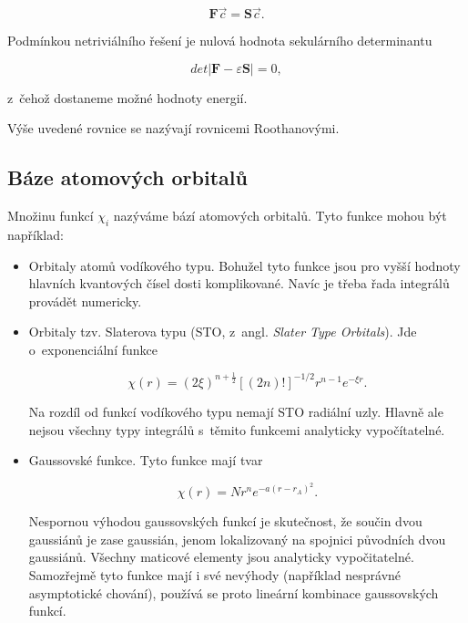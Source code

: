 \begin{equation}
\mathbf{F} \vec{c} = \mathbf{S} \vec{c}.
\label{rov:VE-54}
\end{equation}

Podmínkou netriviálního řešení je nulová hodnota sekulárního determinantu

\begin{equation}
det \vert \mathbf{F} - \varepsilon \mathbf{S} \vert = 0,
\label{rov:VE-55}
\end{equation}

z~čehož dostaneme možné hodnoty energií.

Výše uvedené rovnice se nazývají rovnicemi Roothanovými. 


\subsection{Báze atomových orbitalů}

Množinu funkcí $\chi_i$ nazýváme bází atomových orbitalů.  Tyto funkce mohou být například:
 
\begin{itemize}
\item Orbitaly atomů vodíkového typu. Bohužel tyto funkce jsou pro vyšší hodnoty hlavních kvantových čísel dosti komplikované. Navíc je třeba řada integrálů provádět numericky.

\item Orbitaly tzv. Slaterova typu (STO, z~angl. \textit{Slater Type Orbitals}). Jde o~exponenciální funkce

\begin{equation}
\chi(r) = (2 \xi)^{n+\frac{1}{2}} \left[ (2n)! \right]^{-1/2} r^{n-1} e^{-\xi r}.
\label{rov:VE-56}
\end{equation}

\noindent Na rozdíl od funkcí vodíkového typu nemají STO radiální uzly. Hlavně ale nejsou všechny typy integrálů s~těmito funkcemi analyticky vypočítatelné. 

\item Gaussovské funkce. Tyto funkce mají tvar

\begin{equation}
\chi(r) = N r^n e^{-a(r-r_A)^2}.
\label{rov:VE-57}
\end{equation}

\noindent Nespornou výhodou gaussovských funkcí je skutečnost, že součin dvou gaussiánů je zase gaussián, jenom lokalizovaný na spojnici původních dvou gaussiánů. Všechny maticové elementy jsou analyticky vypočitatelné. Samozřejmě tyto funkce mají i své nevýhody (například nesprávné asymptotické chování), používá se proto lineární kombinace gaussovských funkcí.  

\end{itemize}


